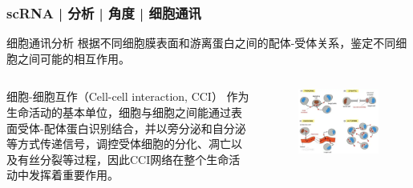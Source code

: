 \documentclass[11pt]{ctexbeamer}
\begin{document}
\begin{frame}
	\frametitle{scRNA | 分析 | 角度 | 细胞通讯}
	\begin{block}{细胞通讯分析}
		根据不同细胞膜表面和游离蛋白之间的配体-受体关系，鉴定不同细胞之间可能的相互作用。
	\end{block}
   \begin{columns}
   	\begin{block}{细胞-细胞互作（Cell-cell interaction, CCI）}
   		作为生命活动的基本单位，细胞与细胞之间能通过表面受体-配体蛋白识别结合，并以旁分泌和自分泌等方式传递信号，调控受体细胞的分化、凋亡以及有丝分裂等过程，因此CCI网络在整个生命活动中发挥着重要作用。
   	\end{block}
   	\begin{figure}
   		\includegraphics[width=\textwidth]{scRNA_CCI_01.png}
   	\end{figure}
   \end{columns}
\end{frame}
\end{document}
